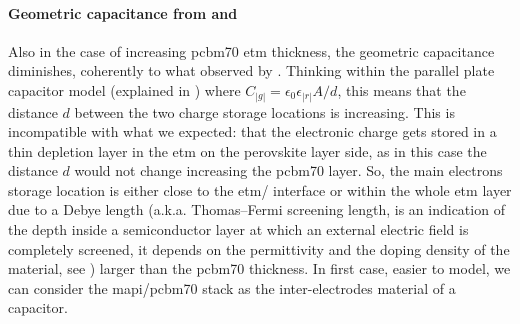 	\begin{figure}
	\end{figure}

	\paragraph{Geometric capacitance from  and }
	Also in the case of increasing \gls{pcbm70} \gls{etm} thickness, the geometric capacitance diminishes, coherently to what observed by .
	Thinking within the parallel plate capacitor model (explained in ) where $C_|g| = \epsilon_0 \epsilon_|r| A / d$, this means that the distance $d$ between the two charge storage locations is increasing.
	This is incompatible with what we expected: that the electronic charge gets stored in a thin depletion layer in the \gls{etm} on the perovskite layer side, as in this case the distance $d$ would not change increasing the \gls{pcbm70} layer.
	So, the main electrons storage location is either close to the \gls{etm}\-/ interface or within the whole \gls{etm} layer due to a Debye length (a.k.a. Thomas–Fermi screening length, is an indication of the depth inside a semiconductor layer at which an external electric field is completely screened, it depends on the permittivity and the doping density of the material, see ) larger than the \gls{pcbm70} thickness.
	In first case, easier to model, we can consider the \gls{mapi}\-/\gls{pcbm70} stack as the inter\hyp{}electrodes material of a capacitor.

